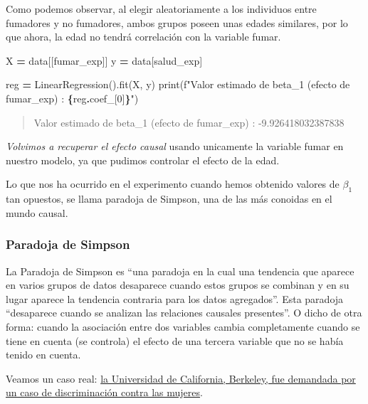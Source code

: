 \documentclass[
  a4paper,
  DIV=11,
  numbers=noendperiod]{scrreprt}
\newenvironment{Shaded}{\begin{snugshade}}{\end{snugshade}}
\newcommand{\BuiltInTok}[1]{#1}
\newcommand{\DecValTok}[1]{\textcolor[rgb]{0.00,0.00,0.81}{#1}}
\newcommand{\NormalTok}[1]{#1}
\newcommand{\OperatorTok}[1]{\textcolor[rgb]{0.81,0.36,0.00}{\textbf{#1}}}
\newcommand{\SpecialCharTok}[1]{\textcolor[rgb]{0.81,0.36,0.00}{\textbf{#1}}}
\newcommand{\SpecialStringTok}[1]{\textcolor[rgb]{0.31,0.60,0.02}{#1}}
\newcommand{\StringTok}[1]{\textcolor[rgb]{0.31,0.60,0.02}{#1}}
\begin{document}
Como podemos observar, al elegir aleatoriamente a los individuos entre
fumadores y no fumadores, ambos grupos poseen unas edades similares, por
lo que ahora, la edad no tendrá correlación con la variable fumar.

\begin{Shaded}
\begin{Highlighting}[numbers=left,,]
\NormalTok{X }\OperatorTok{=}\NormalTok{ data[[}\StringTok{\textquotesingle{}fumar\_exp\textquotesingle{}}\NormalTok{]]}
\NormalTok{y }\OperatorTok{=}\NormalTok{ data[}\StringTok{\textquotesingle{}salud\_exp\textquotesingle{}}\NormalTok{]}

\NormalTok{reg }\OperatorTok{=}\NormalTok{ LinearRegression().fit(X, y)}
\BuiltInTok{print}\NormalTok{(}\SpecialStringTok{f"Valor estimado de beta\_1 (efecto de fumar\_exp)  : }\SpecialCharTok{\{}\NormalTok{reg}\SpecialCharTok{.}\NormalTok{coef\_[}\DecValTok{0}\NormalTok{]}\SpecialCharTok{\}}\SpecialStringTok{"}\NormalTok{)}
\end{Highlighting}
\end{Shaded}

\begin{quote}
Valor estimado de beta\_1 (efecto de fumar\_exp) : -9.926418032387838
\end{quote}

\emph{Volvimos a recuperar el efecto causal} usando unicamente la
variable fumar en nuestro modelo, ya que pudimos controlar el efecto de
la edad.

Lo que nos ha ocurrido en el experimento cuando hemos obtenido valores
de \(\beta_1\) tan opuestos, se llama paradoja de Simpson, una de las
más conoidas en el mundo causal.

\subsubsection{Paradoja de Simpson}\label{paradoja-de-simpson}

La Paradoja de Simpson es ``una paradoja en la cual una tendencia que
aparece en varios grupos de datos desaparece cuando estos grupos se
combinan y en su lugar aparece la tendencia contraria para los datos
agregados''. Esta paradoja ``desaparece cuando se analizan las
relaciones causales presentes''. O dicho de otra forma: cuando la
asociación entre dos variables cambia completamente cuando se tiene en
cuenta (se controla) el efecto de una tercera variable que no se había
tenido en cuenta.

Veamos un caso real:
\href{https://www.science.org/doi/abs/10.1126/science.187.4175.398}{la
Universidad de California, Berkeley, fue demandada por un caso de
discriminación contra las mujeres}.
\end{document}
